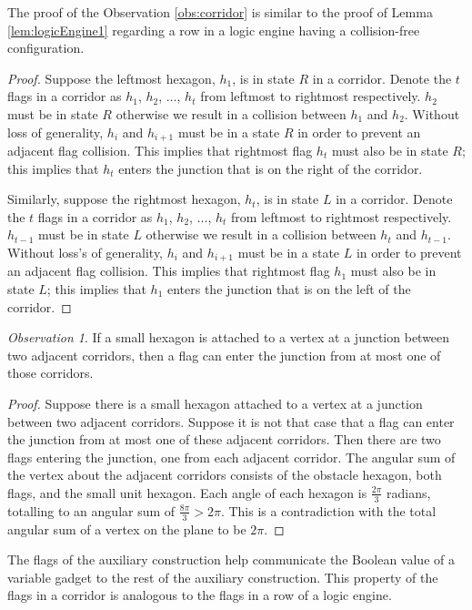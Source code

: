 \documentclass[10pt]{CSUNthesis}
\theoremstyle{plain}%
\theoremstyle{definition}
\theoremstyle{remark}
\newtheorem{observation}{Observation}
\begin{document}
The proof of the Observation \ref{obs:corridor} is similar to the proof of Lemma \ref{lem:logicEngine1} regarding a row in a logic engine having a collision-free configuration.
\begin{proof}
Suppose the leftmost hexagon, $h_1$, is in state $R$ in a corridor.
Denote the $t$ flags in a corridor as $h_1$, $h_2$, $\ldots$, $h_t$ from leftmost to rightmost respectively.
$h_2$ must be in state $R$ otherwise we result in a collision between $h_1$ and $h_2$.
Without loss of generality, $h_i$ and $h_{i+1}$ must be in a state $R$ in order to prevent an adjacent flag collision. 
This implies that rightmost flag $h_t$ must also be in state $R$; this implies that $h_t$ enters the junction that is on the right of the corridor.

Similarly, suppose the rightmost hexagon, $h_t$, is in state $L$ in a corridor.
Denote the $t$ flags in a corridor as $h_1$, $h_2$, $\ldots$, $h_t$ from leftmost to rightmost respectively.
$h_{t-1}$ must be in state $L$ otherwise we result in a collision between $h_t$ and $h_{t-1}$.
Without loss's of generality, $h_i$ and $h_{i+1}$ must be in a state $L$ in order to prevent an adjacent flag collision. 
This implies that rightmost flag $h_1$ must also be in state $L$; this implies that $h_1$ enters the junction that is on the left of the corridor.
\end{proof}

\begin{observation}\label{obs:junction}
If a small hexagon is attached to a vertex at a junction between two adjacent corridors, then a flag can enter the junction from at most one of those corridors.
\end{observation}
\begin{proof}
Suppose there is a small hexagon attached to a vertex at a junction between two adjacent corridors.
Suppose it is not that case that a flag can enter the junction from at most one of these adjacent corridors.
Then there are two flags entering the junction, one from each adjacent corridor.
The angular sum of the vertex about the adjacent corridors consists of the obstacle hexagon, both flags, and the small unit hexagon.
Each angle of each hexagon is $\frac{2 \pi}{3}$ radians, totalling to an angular sum of $\frac{8 \pi}{3} > 2 \pi$.
This is a contradiction with the total angular sum of a vertex on the plane to be $2 \pi$.
\end{proof}

The flags of the auxiliary construction help communicate the Boolean value of a variable gadget to the rest of the auxiliary construction.
This property of the flags in a corridor is analogous to the flags in a row of a logic engine.
\end{document}
